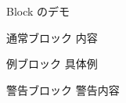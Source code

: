\begin{frame}{Block のデモ}

\begin{block}{通常ブロック}
    内容
\end{block}

\begin{exampleblock}{例ブロック}
    具体例
\end{exampleblock}

\begin{alertblock}{警告ブロック}
    警告内容
\end{alertblock}

\end{frame}
